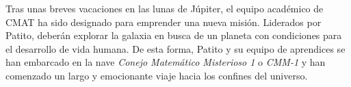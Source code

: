 




\noindent Tras unas breves vacaciones en las lunas de Júpiter, el equipo académico de CMAT ha %
sido designado para emprender una nueva misión. Liderados por Patito, deberán explorar la galaxia %
en busca de un planeta con condiciones para el desarrollo de vida humana. De esta forma, Patito y %
su equipo de aprendices se han embarcado en la nave \emph{Conejo Matemático Misterioso 1} o \emph{CMM-1} %
y han comenzado un largo y emocionante viaje hacia los confines del universo.

